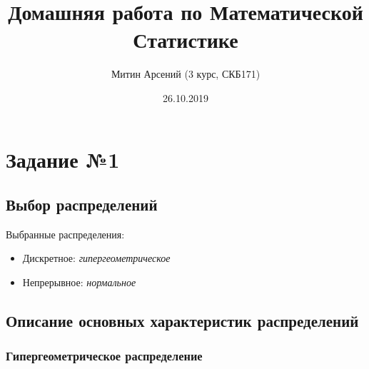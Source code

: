 \documentclass[
  russian,
  a4paper,
  russian]{scrreprt}
\title{Домашняя работа по Математической Статистике}
\author{Митин Арсений (3 курс, СКБ171)}
\date{26.10.2019}
\providecommand{\tightlist}{%
  \setlength{\itemsep}{0pt}\setlength{\parskip}{0pt}}
\begin{document}
\maketitle

\newpage
{
\hypersetup{linkcolor=}
\setcounter{tocdepth}{2}
\tableofcontents
\newpage
}
\providecommand{\mathFunc}[4]{#1\left#2\, #3 \,\right#4}
\providecommand{\mathbbFunc}[4]{\mathFunc{\mathbb{#1}}{#2}{#3}{#4}}
\providecommand{\mathrmFunc}[4]{\mathFunc{\mathrm{#1}}{#2}{#3}{#4}}
\providecommand{\Prob}[1]{\mathbbFunc{P}{(}{#1}{)}}
\providecommand{\Expect}[1]{\mathbbFunc{E}{[}{#1}{]}}
\providecommand{\Var}[1]{\mathrmFunc{Var}{[}{#1}{]}}

\hypertarget{ux437ux430ux434ux430ux43dux438ux435-1}{%
\chapter{Задание №1}\label{ux437ux430ux434ux430ux43dux438ux435-1}}

\hypertarget{ux432ux44bux431ux43eux440-ux440ux430ux441ux43fux440ux435ux434ux435ux43bux435ux43dux438ux439}{%
\section{Выбор
распределений}\label{ux432ux44bux431ux43eux440-ux440ux430ux441ux43fux440ux435ux434ux435ux43bux435ux43dux438ux439}}

Выбранные распределения:

\begin{itemize}
\tightlist
\item
  Дискретное: \emph{гипергеометрическое}
\item
  Непрерывное: \emph{нормальное}
\end{itemize}

\hypertarget{ux43eux43fux438ux441ux430ux43dux438ux435-ux43eux441ux43dux43eux432ux43dux44bux445-ux445ux430ux440ux430ux43aux442ux435ux440ux438ux441ux442ux438ux43a-ux440ux430ux441ux43fux440ux435ux434ux435ux43bux435ux43dux438ux439}{%
\section{Описание основных характеристик
распределений}\label{ux43eux43fux438ux441ux430ux43dux438ux435-ux43eux441ux43dux43eux432ux43dux44bux445-ux445ux430ux440ux430ux43aux442ux435ux440ux438ux441ux442ux438ux43a-ux440ux430ux441ux43fux440ux435ux434ux435ux43bux435ux43dux438ux439}}

\hypertarget{ux433ux438ux43fux435ux440ux433ux435ux43eux43cux435ux442ux440ux438ux447ux435ux441ux43aux43eux435-ux440ux430ux441ux43fux440ux435ux434ux435ux43bux435ux43dux438ux435}{%
\subsection{Гипергеометрическое
распределение}\label{ux433ux438ux43fux435ux440ux433ux435ux43eux43cux435ux442ux440ux438ux447ux435ux441ux43aux43eux435-ux440ux430ux441ux43fux440ux435ux434ux435ux43bux435ux43dux438ux435}}
\end{document}
